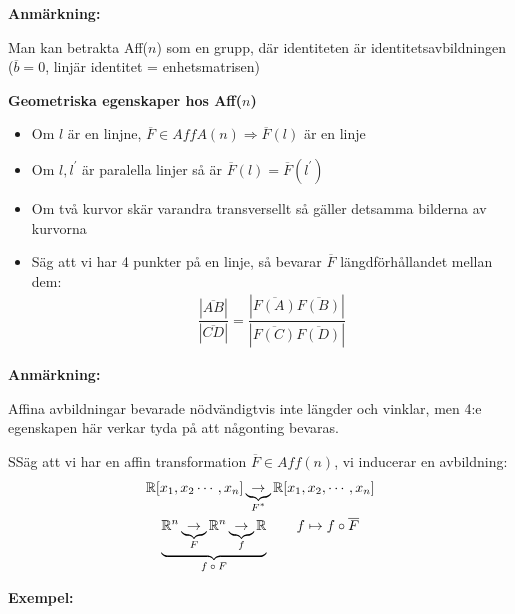 \par\bigskip
\noindent\textbf{Anmärkning:}\par
\noindent Man kan betrakta Aff($n$) som en grupp, där identiteten är identitetsavbildningen ($\overline{b} = 0$, linjär identitet = enhetsmatrisen)
\par\bigskip
\noindent\textbf{Geometriska egenskaper hos Aff($n$)}\par
\begin{itemize}
  \item Om $l$ är en linjne, $\overline{F}\in AffA(n) \Rightarrow\overline{F}(l)$ är en linje
  \item Om $l,l^{\prime}$ är paralella linjer så är $\overline{F}(l) = \overline{F}(l^{\prime})$
  \item Om två kurvor skär varandra transversellt så gäller detsamma bilderna av kurvorna 
  \item Säg att vi har 4 punkter på en linje, så bevarar $\overline{F}$ längdförhållandet mellan dem:
    \begin{equation*}
      \begin{gathered}
        \dfrac{\left|\overline{AB}\right|}{\left|\overline{CD}\right|} = \dfrac{\left|\overline{F(A)}\overline{F(B)}\right|}{\left|\overline{F(C)}\overline{F(D)}\right|}
      \end{gathered}
    \end{equation*}
\end{itemize}
\par\bigskip
\noindent\textbf{Anmärkning:}\par
\noindent Affina avbildningar bevarade nödvändigtvis inte längder och vinklar, men 4:e egenskapen här verkar tyda på att någonting bevaras.
\par\bigskip
\begin{theo}
  SSäg att vi har en affin transformation $\overline{F}\in Aff(n)$, vi inducerar en avbildning:
  \begin{equation*}
    \begin{gathered}
      \mathbb{R}[x_1,x_2\cdots,x_n]\underbrace{\to}_{\text{$F^*$}}\mathbb{R}[x_1,x_2,\cdots,x_n]\\
      \underbrace{\mathbb{R}^n\underbrace{\to}_{\text{$F$}}\mathbb{R}^n\underbrace{\to}_{\text{$f$}}\mathbb{R}}_{\text{$f\circ F$}}\qquad f\mapsto f\circ \overline{F}
    \end{gathered}
  \end{equation*}
\end{theo}
\par\bigskip
\noindent\textbf{Exempel:}
